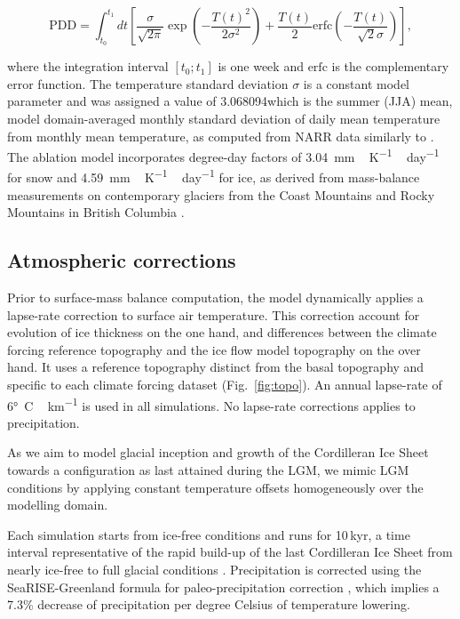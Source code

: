 \begin{equation}
	\mathrm{PDD} = \int_{t_0}^{t_1} dt \left[
		\frac{\sigma}{\sqrt{2\pi}}
		\exp\left({-\frac{T(t)^2}{2\sigma^2}}\right)
		+\frac{T(t)}{2}
		\mathrm{erfc} \left(-\frac{T(t)}{\sqrt{2}\sigma}\right)
	\right],
\end{equation}

where the integration interval $[t_0; t_1]$ is one week and $\mathrm{erfc}$ is the complementary error function. The temperature standard deviation $\sigma$ is a constant model parameter and was assigned a value of 3.068094\degC which is the summer (JJA) mean, model domain-averaged monthly standard deviation of daily mean temperature from monthly mean temperature, as computed from NARR data similarly to \citet{seguinot-inreview}. The ablation model incorporates degree-day factors of 3.04~\unit{mm\,K^{-1}\,day^{-1}} for snow and 4.59~\unit{mm\,K^{-1}\,day^{-1}} for ice, as derived from mass-balance measurements on contemporary glaciers from the Coast Mountains and Rocky Mountains in British Columbia \citep{shea-etal-2009}.


\subsection{Atmospheric corrections}

Prior to surface-mass balance computation, the model dynamically applies a lapse-rate correction to surface air temperature. This correction account for evolution of ice thickness on the one hand, and differences between the climate forcing reference topography and the ice flow model topography on the over hand. It uses a reference topography distinct from the basal topography and specific to each climate forcing dataset (Fig.~\ref{fig:topo}). An annual lapse-rate of 6\unit{\degree C\,km^{-1}} is used in all simulations. No lapse-rate corrections applies to precipitation.

As we aim to model glacial inception and growth of the Cordilleran Ice Sheet towards a configuration as last attained during the LGM, we mimic LGM conditions by applying constant temperature offsets homogeneously over the modelling domain. 

Each simulation starts from ice-free conditions and runs for 10\,kyr, a time interval representative of the rapid build-up of the last Cordilleran Ice Sheet from nearly ice-free to full glacial conditions \citep{clague-1989,stroeven-etal-2010}. Precipitation is corrected using the SeaRISE-Greenland formula for paleo-precipitation correction \citep{huybrechts-2002}, which implies a 7.3\% decrease of precipitation per degree Celsius of temperature lowering.

